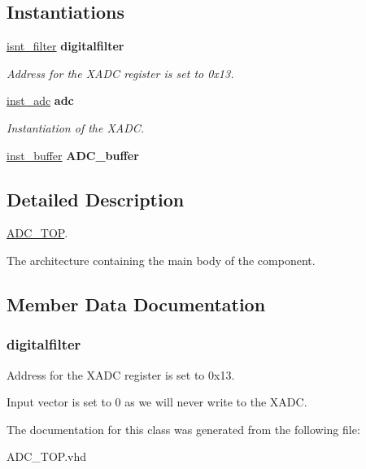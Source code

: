 \subsection*{Instantiations}
 \begin{DoxyCompactItemize}
\item 
\hyperlink{classADC__TOP_1_1TOP__ADC_a81c79629e96df5c724d8c3a91688a867}{isnt\-\_\-filter}  {\bfseries digitalfilter}   
\begin{DoxyCompactList}\small\item\em Address for the X\-A\-D\-C register is set to 0x13. \end{DoxyCompactList}\item 
\hypertarget{classADC__TOP_1_1TOP__ADC_ad035aeedbb36bd6303acc72526b48022}{\hyperlink{classADC__TOP_1_1TOP__ADC_ad035aeedbb36bd6303acc72526b48022}{inst\-\_\-adc}  {\bfseries adc}   }\label{classADC__TOP_1_1TOP__ADC_ad035aeedbb36bd6303acc72526b48022}

\begin{DoxyCompactList}\small\item\em Instantiation of the X\-A\-D\-C. \end{DoxyCompactList}\item 
\hypertarget{classADC__TOP_1_1TOP__ADC_adf88e6da5f53b3204a0fd1ba0ced2982}{\hyperlink{classADC__TOP_1_1TOP__ADC_adf88e6da5f53b3204a0fd1ba0ced2982}{inst\-\_\-buffer}  {\bfseries A\-D\-C\-\_\-buffer}   }\label{classADC__TOP_1_1TOP__ADC_adf88e6da5f53b3204a0fd1ba0ced2982}

\end{DoxyCompactItemize}


\subsection{Detailed Description}
\hyperlink{classADC__TOP}{A\-D\-C\-\_\-\-T\-O\-P}. 

The architecture containing the main body of the component. 

\subsection{Member Data Documentation}
\hypertarget{classADC__TOP_1_1TOP__ADC_a81c79629e96df5c724d8c3a91688a867}{
\subsubsection[{isnt\-\_\-filter}]{ {\bfseries \textcolor{vhdlchar}{digitalfilter}\textcolor{vhdlchar}{ }} \hspace{0.3cm}{\ttfamily [Instantiation]}}}\label{classADC__TOP_1_1TOP__ADC_a81c79629e96df5c724d8c3a91688a867}


Address for the X\-A\-D\-C register is set to 0x13. 

Input vector is set to 0 as we will never write to the X\-A\-D\-C. 

The documentation for this class was generated from the following file\-:\begin{DoxyCompactItemize}
\item 
A\-D\-C\-\_\-\-T\-O\-P.\-vhd\end{DoxyCompactItemize}
